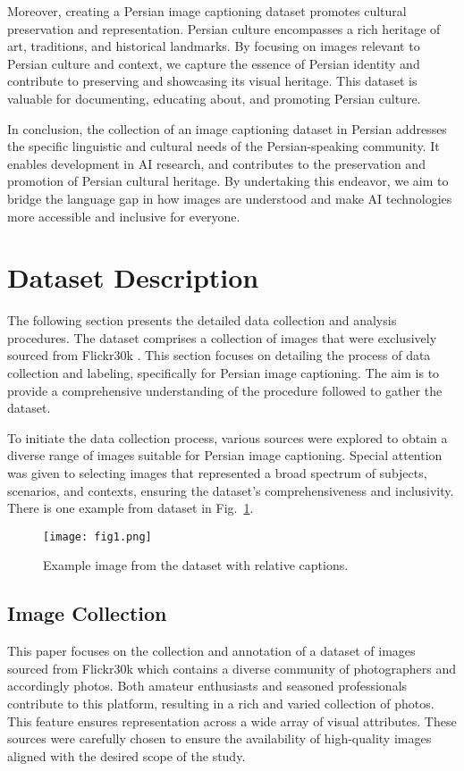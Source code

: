 \documentclass[runningheads]{llncs}
\begin{document}
Moreover, creating a Persian image captioning dataset promotes cultural preservation and representation. Persian culture encompasses a rich heritage of art, traditions, and historical landmarks. By focusing on images relevant to Persian culture and context, we capture the essence of Persian identity and contribute to preserving and showcasing its visual heritage. This dataset is valuable for documenting, educating about, and promoting Persian culture.

In conclusion, the collection of an image captioning dataset in Persian addresses the specific linguistic and cultural needs of the Persian-speaking community. It enables development in AI research, and contributes to the preservation and promotion of Persian cultural heritage. By undertaking this endeavor, we aim to bridge the language gap in how images are understood and make AI technologies more accessible and inclusive for everyone.

\section{Dataset Description}
The following section presents the detailed data collection and analysis procedures. The dataset comprises a collection of images that were exclusively sourced from Flickr30k \cite{Flickr30k}. This section focuses on detailing the process of data collection and labeling, specifically for Persian image captioning. The aim is to provide a comprehensive understanding of the procedure followed to gather the dataset.

To initiate the data collection process, various sources were explored to obtain a diverse range of images suitable for Persian image captioning. Special attention was given to selecting images that represented a broad spectrum of subjects, scenarios, and contexts, ensuring the dataset's comprehensiveness and inclusivity. There is one example from dataset in Fig.~\ref{fig1}. 

\vspace{-\baselineskip}
\begin{figure}[htbp]
  \texttt{[image: fig1.png]}
  \caption{Example image from the dataset with relative captions.}
  \label{fig1}
\end{figure}
\vspace{-\baselineskip}

\subsection{Image Collection}
This paper focuses on the collection and annotation of a dataset of images sourced from Flickr30k \cite{Flickr30k} which contains a diverse community of photographers and accordingly photos. Both amateur enthusiasts and seasoned professionals contribute to this platform, resulting in a rich and varied collection of photos. This feature ensures representation across a wide array of visual attributes. These sources were carefully chosen to ensure the availability of high-quality images aligned with the desired scope of the study.
\end{document}
